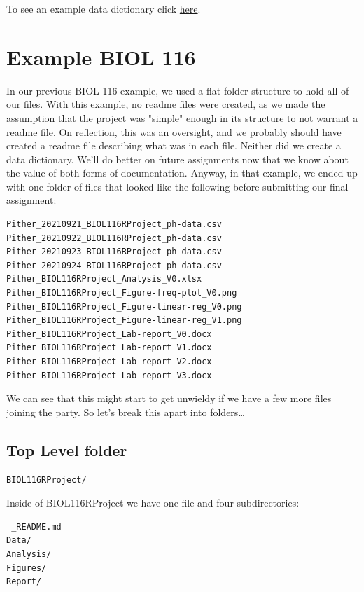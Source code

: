 \documentclass[
]{book}
\begin{document}
To see an example data dictionary click \href{files/DS_DATA-DICTIONARY.md}{here}.

\hypertarget{example-biol-116}{%
\section{Example BIOL 116}\label{example-biol-116}}

In our previous BIOL 116 example, we used a flat folder structure to hold all of our files. With this example, no readme files were created, as we made the assumption that the project was "simple" enough in its structure to not warrant a readme file. On reflection, this was an oversight, and we probably should have created a readme file describing what was in each file. Neither did we create a data dictionary. We'll do better on future assignments now that we know about the value of both forms of documentation. Anyway, in that example, we ended up with one folder of files that looked like the following before submitting our final assignment:

\begin{verbatim}
Pither_20210921_BIOL116RProject_ph-data.csv
Pither_20210922_BIOL116RProject_ph-data.csv
Pither_20210923_BIOL116RProject_ph-data.csv
Pither_20210924_BIOL116RProject_ph-data.csv
Pither_BIOL116RProject_Analysis_V0.xlsx
Pither_BIOL116RProject_Figure-freq-plot_V0.png
Pither_BIOL116RProject_Figure-linear-reg_V0.png
Pither_BIOL116RProject_Figure-linear-reg_V1.png
Pither_BIOL116RProject_Lab-report_V0.docx
Pither_BIOL116RProject_Lab-report_V1.docx
Pither_BIOL116RProject_Lab-report_V2.docx
Pither_BIOL116RProject_Lab-report_V3.docx
\end{verbatim}

We can see that this might start to get unwieldy if we have a few more files joining the party. So let's break this apart into folders\ldots{}

\hypertarget{top-level-folder}{%
\subsection*{Top Level folder}\label{top-level-folder}}

\begin{verbatim}
BIOL116RProject/
\end{verbatim}

Inside of BIOL116RProject we have one file and four subdirectories:

\begin{verbatim}
 _README.md
Data/ 
Analysis/
Figures/
Report/
\end{verbatim}
\end{document}
